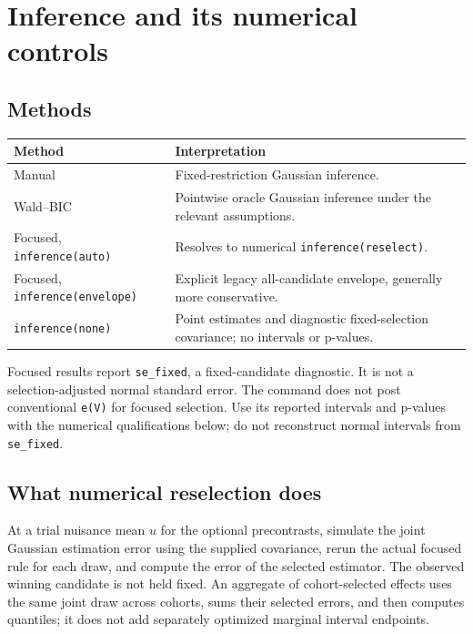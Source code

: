 \documentclass[11pt]{article}
\newcommand{\cmd}[1]{\texttt{#1}}
\begin{document}
\section{Inference and its numerical controls}
\subsection{Methods}

\begin{tabularx}{\linewidth}{@{}lX@{}}
\toprule
Method & Interpretation \\
\midrule
Manual & Fixed-restriction Gaussian inference. \\
Wald--BIC & Pointwise oracle Gaussian inference under the relevant assumptions. \\
Focused, \cmd{inference(auto)} & Resolves to numerical \cmd{inference(reselect)}. \\
Focused, \cmd{inference(envelope)} & Explicit legacy all-candidate envelope, generally more conservative. \\
\cmd{inference(none)} & Point estimates and diagnostic fixed-selection covariance; no intervals or p-values. \\
\bottomrule
\end{tabularx}

Focused results report \cmd{se\_fixed}, a fixed-candidate diagnostic.
It is not a selection-adjusted normal standard error. The command does not
post conventional \cmd{e(V)} for focused selection. Use its reported intervals
and p-values with the numerical qualifications below; do not reconstruct
normal intervals from \cmd{se\_fixed}.

\subsection{What numerical reselection does}
At a trial nuisance mean $u$ for the optional precontrasts, simulate the joint
Gaussian estimation error using the supplied covariance, rerun the actual
focused rule for each draw, and compute the error of the selected estimator.
The observed winning candidate is not held fixed. An aggregate of
cohort-selected effects uses the same joint draw across cohorts, sums their
selected errors, and then computes quantiles; it does not add separately
optimized marginal interval endpoints.
\end{document}
